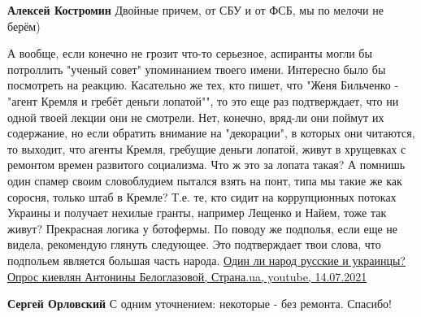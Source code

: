 \begin{itemize}
\begin{itemize}
 
\textbf{Алексей Костромин} Двойные причем, от СБУ и от ФСБ, мы по мелочи не берём)
\end{itemize}

 

А вообще, если конечно не грозит что-то серьезное, аспиранты могли бы
потроллить "ученый совет" упоминанием твоего имени. Интересно было бы
посмотреть на реакцию. Касательно же тех, кто пишет, что "Женя Бильченко -
"агент Кремля и гребёт деньги лопатой"", то это еще раз подтверждает, что ни
одной твоей лекции они не смотрели. Нет, конечно, вряд-ли они поймут их
содержание, но если обратить внимание на "декорации", в которых они читаются,
то выходит, что агенты Кремля, гребущие деньги лопатой, живут в хрущевках с
ремонтом времен развитого социализма. Что ж это за лопата такая? А помнишь один
спамер своим словоблудием пытался взять на понт, типа мы такие же как соросня,
только штаб в Кремле? Т.е. те, кто сидит на коррупционных потоках Украины и
получает нехилые гранты, например Лещенко и Найем, тоже так живут? Прекрасная
логика у ботофермы. По поводу же подполья, если еще не видела, рекомендую
глянуть следующее. Это подтверждает твои слова, что подпольем является большая
часть народа.
\href{https://www.youtube.com/watch?v=WkHU4PY4mkE}{%
Один ли народ русские и украинцы? Опрос киевлян Антонины Белоглазовой,%
Страна.ua, youtube, 14.07.2021%
}

 
\textbf{Сергей Орловский} С одним уточнением: некоторые - без ремонта. Спасибо!


\end{itemize}

